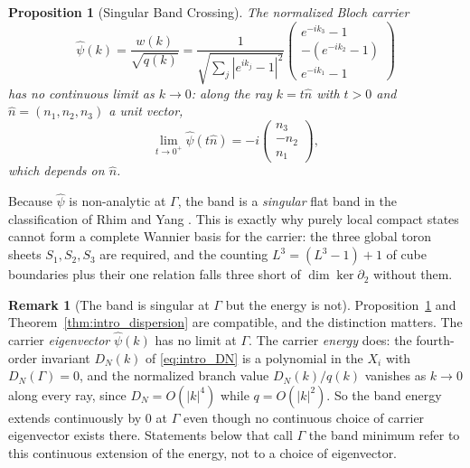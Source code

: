 \documentclass[11pt,a4paper]{article}
\newtheorem{proposition}[theorem]{Proposition}
\theoremstyle{definition}
\newtheorem{remark}[theorem]{Remark}
\begin{document}
\begin{proposition}[Singular Band Crossing]\label{prop:singular_crossing}
The normalized Bloch carrier
\begin{equation}
  \hat\psi(k) = \frac{w(k)}{\sqrt{q(k)}}
  = \frac{1}{\sqrt{\sum_j|e^{ik_j}-1|^2}}\begin{pmatrix} e^{-ik_3}-1 \\ -(e^{-ik_2}-1) \\ e^{-ik_1}-1\end{pmatrix}
\end{equation}
has no continuous limit as $k \to 0$: along the ray $k = t\hat n$ with $t>0$ and $\hat n = (n_1,n_2,n_3)$ a unit vector,
\begin{equation}
  \lim_{t\to 0^+}\hat\psi(t\hat n) = -i\begin{pmatrix} n_3 \\ -n_2 \\ n_1\end{pmatrix},
\end{equation}
which depends on $\hat n$.
\end{proposition}

Because $\hat\psi$ is non-analytic at $\Gamma$, the band is a \emph{singular} flat band in the classification of Rhim and Yang \cite{Rhim2019,BergmanWuBalents2008}. This is exactly why purely local compact states cannot form a complete Wannier basis for the carrier: the three global toron sheets $S_1,S_2,S_3$ are required, and the counting $L^3 = (L^3-1)+1$ of cube boundaries plus their one relation falls three short of $\dim\ker\partial_2$ without them.

\begin{remark}[The band is singular at $\Gamma$ but the energy is not]\label{rem:gamma_reconciliation}
Proposition~\ref{prop:singular_crossing} and Theorem~\ref{thm:intro_dispersion} are compatible, and the distinction matters. The carrier \emph{eigenvector} $\hat\psi(k)$ has no limit at $\Gamma$. The carrier \emph{energy} does: the fourth-order invariant $D_N(k)$ of \eqref{eq:intro_DN} is a polynomial in the $X_i$ with $D_N(\Gamma) = 0$, and the normalized branch value $D_N(k)/q(k)$ vanishes as $k\to 0$ along every ray, since $D_N = O(|k|^4)$ while $q = O(|k|^2)$. So the band energy extends continuously by $0$ at $\Gamma$ even though no continuous choice of carrier eigenvector exists there. Statements below that call $\Gamma$ the band minimum refer to this continuous extension of the energy, not to a choice of eigenvector.
\end{remark}
\end{document}
